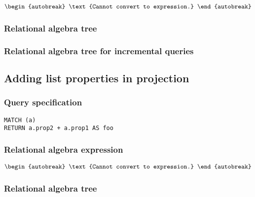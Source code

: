 \begin{align*}
\begin{autobreak}
\text{Cannot convert to expression.}
\end{autobreak}
\end{align*}

\subsubsection*{Relational algebra tree}


\subsubsection*{Relational algebra tree for incremental queries}


\subsection{Adding list properties in projection}

\subsubsection*{Query specification}

\begin{lstlisting}
MATCH (a)
RETURN a.prop2 + a.prop1 AS foo
\end{lstlisting}

\subsubsection*{Relational algebra expression}

\begin{align*}
\begin{autobreak}
\text{Cannot convert to expression.}
\end{autobreak}
\end{align*}

\subsubsection*{Relational algebra tree}



